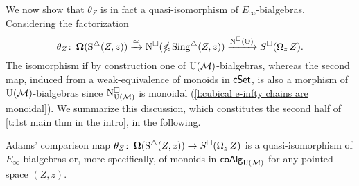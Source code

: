 We now show that $\theta_Z$ is in fact a quasi-isomorphism of $E_{\infty}$-bialgebras.
Considering the factorization
\begin{equation*}
\theta_Z \colon \operatorname{\mathbf{\Omega}}(\operatorname{S^{\triangle}}(Z, z)) \xrightarrow{\cong} 
\operatorname{N^{\square}}(\operatorname{\mathbb{\Omega}} \operatorname{Sing^{\triangle}}(Z, z)) \xrightarrow{\operatorname{N^{\square}}(\Theta)} 
S^{\square}(\operatorname{\Omega}_z Z).
\end{equation*}
The isomorphism if by construction one of ${\operatorname{U}(\mathcal{M})}$-bialgebras, whereas the second map, induced from a weak-equivalence of monoids in $\mathsf{cSet}$, is also a morphism of ${\operatorname{U}(\mathcal{M})}$-bialgebras
since $\operatorname{N^{\square}_{{\operatorname{U}(\mathcal{M})}}}$ is monoidal (\cref{l:cubical e-infty chains are monoidal}).
We summarize this discussion, which constitutes the second half of \cref{t:1st main thm in the intro}, in the following.

\begin{lemma} \label{l:adams comparison is an e-infty bialgebra map}
	Adams' comparison map $\theta_Z \colon \operatorname{\mathbf{\Omega}}(\operatorname{S^{\triangle}}(Z, z)) \to S^{\square}(\operatorname{\Omega}_z Z)$ is a quasi-isomorphism of $E_{\infty}$-bialgebras or, more specifically, of monoids in $\mathsf{coAlg}_{\operatorname{U}(\mathcal{M})}$ for any pointed space $(Z, z)$.
\end{lemma}
